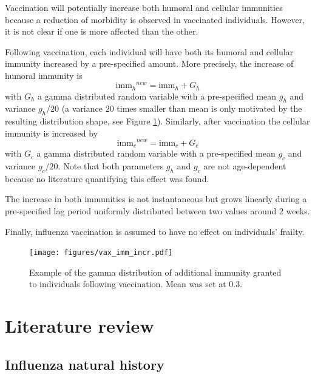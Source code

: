 \documentclass[11pt, onecolumn]{article}
\newcommand{\immh}{\ensuremath{\text{imm}_h}}
\newcommand{\immc}{\ensuremath{\text{imm}_c}}
\begin{document}
Vaccination will potentially increase both humoral and cellular immunities because a reduction of morbidity is observed in vaccinated individuals. However, it is not clear if one is more affected than the other. 

Following vaccination, each individual will have both its humoral and cellular immunity increased by a pre-specified amount. More precisely, the increase of humoral immunity is
\begin{equation}
\immh^{new} = \immh + G_h
\end{equation}
with $G_h$ a gamma distributed random variable with a pre-specified mean $g_h$ and variance $g_h/20$ (a variance 20 times smaller than mean is  only motivated by the resulting distribution shape, see Figure \ref{fig:vax_imm_incr}). 
Similarly, after vaccination the cellular immunity is increased by
\begin{equation}
\immc^{new} = \immc + G_c
\end{equation}
with $G_c$ a gamma distributed random variable with a pre-specified mean $g_c$ and variance $g_c/20$. 
Note that both parameters $g_h$ and $g_c$ are not age-dependent because no literature quantifying this effect was found.

The increase in both immunities is not instantaneous but grows linearly during a pre-specified lag period uniformly distributed between two values around 2 weeks.

Finally, influenza vaccination is assumed to have no effect on individuals' frailty. 

\begin{figure}[!ht]
\centering
    \texttt{[image: figures/vax\_imm\_incr.pdf]}
\caption{Example of the gamma distribution of additional immunity granted to individuals following vaccination. Mean was set at 0.3.}
\label{fig:vax_imm_incr}
\end{figure}








\newpage
\appendix

\section{Literature review}

\subsection{Influenza natural history}
\end{document}
